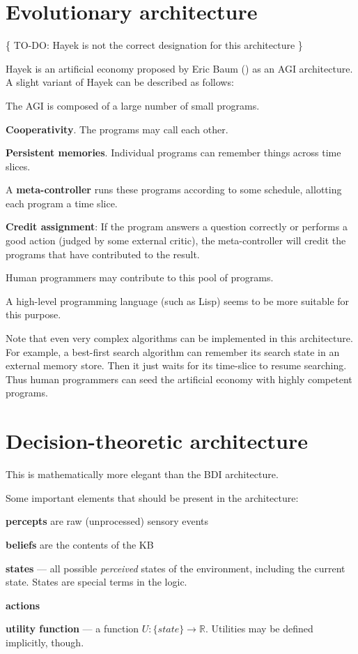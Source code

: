 \section{Evolutionary architecture}

\{ TO-DO:  Hayek is not the correct designation for this architecture \}

Hayek is an artificial economy proposed by Eric Baum (\citep*{Baum2004}) as an AGI architecture.  A slight variant of Hayek can be described as follows:

\begin{compactenum}
\item The AGI is composed of a large number of small programs.
\item \textbf{Cooperativity}.  The programs may call each other.
\item \textbf{Persistent memories}.  Individual programs can remember things across time slices.
\item A \textbf{meta-controller} runs these programs according to some schedule, allotting each program a time slice.
\item \textbf{Credit assignment}:  If the program answers a question correctly or performs a good action (judged by some external critic), the meta-controller will credit the programs that have contributed to the result.
\item Human programmers may contribute to this pool of programs.\\
\end{compactenum}

A high-level programming language (such as Lisp) seems to be more suitable for this purpose.

Note that even very complex algorithms can be implemented in this architecture.  For example, a best-first search algorithm can remember its search state in an external memory store.  Then it just waits for its time-slice to resume searching.  Thus human programmers can seed the artificial economy with highly competent programs.

\section{Decision-theoretic architecture}

This is mathematically more elegant than the BDI architecture.

Some important elements that should be present in the architecture:
\begin{compactenum}[1.]
\item  \textbf{percepts} are raw (unprocessed) sensory events
\item  \textbf{beliefs} are the contents of the KB
\item  \textbf{states} --- all possible \textit{perceived} states of the environment, including the current state.  States are special terms in the logic.
\item  \textbf{actions}
\item  \textbf{utility function} --- a function $U: \{state\} \rightarrow \mathbb{R}$.  Utilities may be defined implicitly, though.
\\
\end{compactenum}

